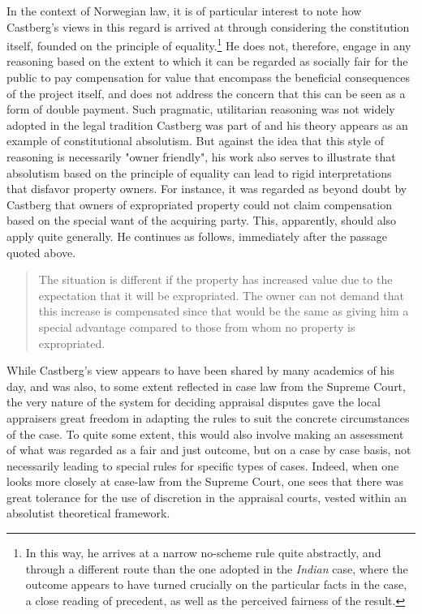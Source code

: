 In the context of Norwegian law, it is of particular interest to note how Castberg's views in this regard is arrived at through considering the constitution itself, founded on the principle of equality.\footnote{In this way, he arrives at a narrow no-scheme rule quite abstractly, and through a different route than the one adopted in the \emph{Indian} case, where the outcome appears to have turned crucially on the particular facts in the case, a close reading of precedent, as well as the perceived fairness of the result.} He does not, therefore, engage in any reasoning based on the extent to which it can be regarded as socially fair for the public to pay compensation for value that encompass the beneficial consequences of the project itself, and does not address the concern that this can be seen as a form of double payment. Such pragmatic, utilitarian reasoning was not widely adopted in the legal tradition Castberg was part of and his theory appears as an example of constitutional absolutism. But against the idea that this style of reasoning is necessarily "owner friendly", his work also serves to illustrate that absolutism based on the principle of equality can lead to rigid interpretations that disfavor property owners. For instance, it was regarded as beyond doubt by Castberg that owners of expropriated property could not claim compensation based on the special want of the acquiring party. This, apparently, should also apply quite generally. He continues as follows, immediately after the passage quoted above.

\begin{quote}
The situation is different if the property has increased value due to the expectation that it will be expropriated. The owner can not demand that this increase is compensated since that would be the same as giving him a special advantage compared to those from whom no property is expropriated.
\end{quote}

While Castberg's view appears to have been shared by many academics of his day, and was also, to some extent reflected in case law from the Supreme Court, the very nature of the system for deciding appraisal disputes gave the local appraisers great freedom in adapting the rules to suit the concrete circumstances of the case. To quite some extent, this would also involve making an assessment of what was regarded as a fair and just outcome, but on a case by case basis, not necessarily leading to special rules for specific types of cases. Indeed, when one looks more closely at case-law from the Supreme Court, one sees that there was  great tolerance for the use of discretion in the appraisal courts, vested within an absolutist theoretical framework.

